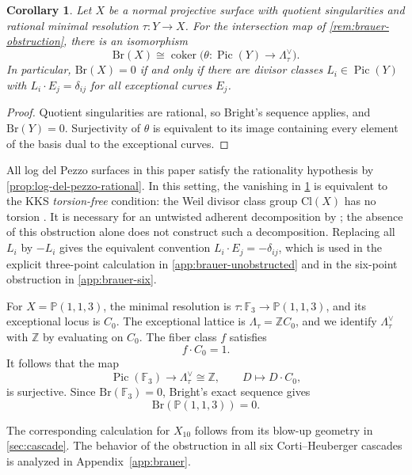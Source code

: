 \documentclass[11pt]{article}
\theoremstyle{plain}
\newtheorem{corollary}[corollary]{Corollary}
\theoremstyle{definition}
\theoremstyle{remark}
\newcommand{\Pp}{\mathbb P}
\newcommand{\F}{\mathbb F}
\newcommand{\Z}{\mathbb Z}
\newcommand{\Pic}{\operatorname{Pic}}
\newcommand{\Cl}{\mathrm{Cl}}
\newcommand{\Br}{\mathrm{Br}}
\begin{document}
\begin{corollary}\label{cor:brauer-cokernel}
Let \(X\) be a normal projective surface with quotient singularities and
rational minimal resolution \(\tau:Y\to X\). For the intersection map of
\cref{rem:brauer-obstruction}, there is an isomorphism
\[
\Br(X)\cong\operatorname{coker}
\bigl(\theta:\Pic(Y)\longrightarrow\Lambda_\tau^\vee\bigr).
\]
In particular, \(\Br(X)=0\) if and only if there are divisor classes
\(L_i\in\Pic(Y)\) with \(L_i\cdot E_j=\delta_{ij}\) for all exceptional
curves \(E_j\).
\end{corollary}

\begin{proof}
Quotient singularities are rational, so Bright's sequence applies, and
\(\Br(Y)=0\). Surjectivity of \(\theta\) is equivalent to its image
containing every element of the basis dual to the exceptional curves.
\end{proof}

All log del Pezzo surfaces in this paper satisfy the rationality hypothesis
by \cref{prop:log-del-pezzo-rational}. In this setting, the vanishing in
\cref{cor:brauer-cokernel} is equivalent to the KKS \emph{torsion-free}
condition: the Weil divisor class group \(\Cl(X)\) has no torsion
\cite[Definition~4.7]{KKS2020}. It is necessary for an untwisted adherent
decomposition by \cite[Corollary~4.8]{KKS2020}; the absence of this
obstruction alone does not construct such a decomposition. Replacing all
\(L_i\) by \(-L_i\) gives the equivalent convention
\(L_i\cdot E_j=-\delta_{ij}\), which is used in the explicit three-point
calculation in \cref{app:brauer-unobstructed} and in the six-point
obstruction in \cref{app:brauer-six}.

For \(X=\Pp(1,1,3)\), the minimal resolution is
\(\tau:\F_3\to \Pp(1,1,3)\), and its exceptional locus is \(C_0\). The
exceptional lattice is \(\Lambda_\tau=\Z C_0\), and we identify
\(\Lambda_\tau^\vee\) with \(\Z\) by
evaluating on \(C_0\). The fiber class \(f\) satisfies
\[
f\cdot C_0=1.
\]
It follows that the map
\[
\Pic(\F_3)\longrightarrow \Lambda_\tau^\vee\cong \Z,
\qquad
D\longmapsto D\cdot C_0,
\]
is surjective. Since \(\Br(\F_3)=0\), Bright's exact sequence gives
\[
\Br(\Pp(1,1,3))=0.
\]

The corresponding calculation for \(X_{10}\) follows from its blow-up
geometry in \cref{sec:cascade}. The behavior of the obstruction in all six
Corti--Heuberger cascades is analyzed in Appendix~\ref{app:brauer}.

\end{document}
